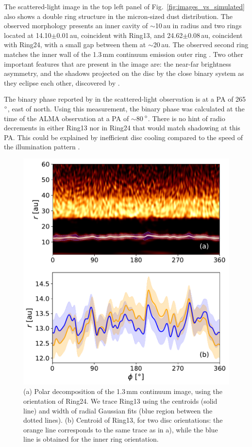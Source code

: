 \documentclass[fleqn,usenatbib,useAMS]{mnras}
\begin{document}
The scattered-light image in the top left panel of Fig.~\ref{fig:images_vs_simulated} also shows a double ring structure in the micron-sized dust distribution. The observed morphology presents an inner cavity of $\sim$10\,au in radius and two rings located at 14.10$\pm$0.01\,au, coincident with Ring13, and 24.62$\pm$0.08\,au, coincident with Ring24, with a small gap between them at $\sim$20\,au. The observed second ring matches the inner wall of the 1.3\,mm continuum emission outer ring \citep{Ru_z_Rodr_guez_2019}. Two other important features that are present in the image are: the near-far brightness asymmetry, and the shadows projected on the disc by the close binary system as they eclipse each other, discovered by \citet{dOrazi}.

The binary phase reported by \citet{dOrazi} in the scattered-light observation is at a PA of 265\,$\hbox{$^\circ$}$, east of north. Using this measurement, the binary phase was calculated at the time of the ALMA observation at a PA of $\sim$80\,$\hbox{$^\circ$}$. There is no hint of radio decrements in either Ring13 nor in Ring24 that would match shadowing at this PA. This could be explained by inefficient disc cooling compared to the speed of the illumination pattern \citep[see ][ for estimates of this cooling timescale]{Casassus2019MNRAS.486L..58C}. 

\begin{figure}
    \includegraphics[width=\columnwidth]{polar_ring_aprox_and_diff_inner.pdf}
    \caption{(a) Polar decomposition of the 1.3\,mm continuum image, using the orientation of Ring24. We trace Ring13 using the centroids (solid line) and width of radial Gaussian fits (blue region between the dotted lines). (b) Centroid of Ring13, for two disc orientations: the orange line corresponds to the same trace as in a), while the blue line is obtained for the inner ring orientation.}
    \label{fig:polarring}
\end{figure}
\end{document}
